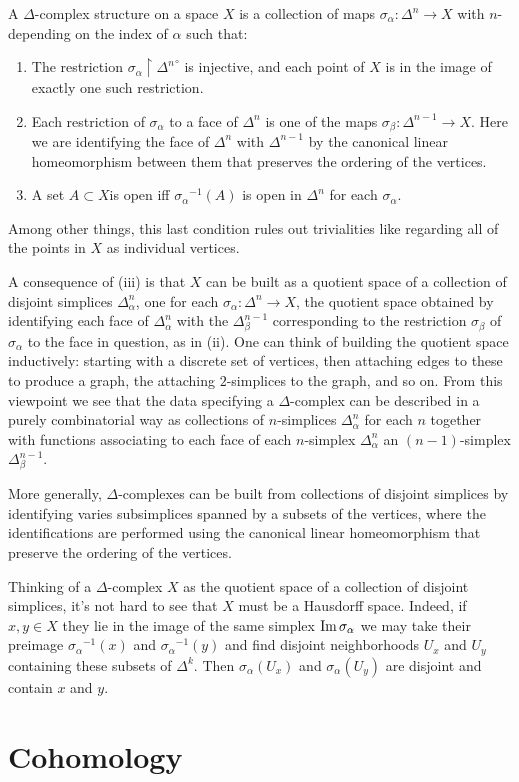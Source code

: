 A $\Delta$-complex structure on a space $X$ is a collection of maps
$\sigma_\alpha\colon\Delta^n\to X$ with $n$-depending on the index of
$\alpha$ such that:
\begin{enumerate}[label=(\roman*)]
\item The restriction
  $\sigma_\alpha\restriction\left.\Delta^n\right.^\circ$ is
  injective, and each point of $X$ is in the image of exactly one such
  restriction.
\item Each restriction of $\sigma_\alpha$ to a face of $\Delta^n$ is one of
  the maps $\sigma_\beta\colon\Delta^{n-1}\to X$. Here we are
  identifying the face of $\Delta^n$ with $\Delta^{n-1}$ by the canonical
  linear homeomorphism between them that preserves the ordering of the
  vertices.
\item A set $A\subset X$is open iff ${\sigma_\alpha}^{-1}(A)$ is open in
  $\Delta^n$ for each $\sigma_\alpha$.
\end{enumerate}
Among other things, this last condition rules out trivialities like
regarding all of the points in $X$ as individual vertices.

A consequence of (iii) is that $X$ can be built as a quotient space of a
collection of disjoint simplices $\Delta_\alpha^n$, one for each
$\sigma_\alpha\colon\Delta^n\to X$, the quotient space obtained by
identifying each face of $\Delta_\alpha^n$ with the $\Delta_\beta^{n-1}$
corresponding to the restriction $\sigma_\beta$ of $\sigma_\alpha$ to the
face in question, as in (ii). One can think of building the quotient space
inductively: starting with a discrete set of vertices, then attaching edges
to these to produce a graph, the attaching $2$-simplices to the graph, and
so on. From this viewpoint we see that the data specifying a
$\Delta$-complex can be described in a purely combinatorial way as
collections of $n$-simplices $\Delta_\alpha^n$ for each $n$ together with
functions associating to each face of each $n$-simplex $\Delta_\alpha^n$ an
$(n-1)$-simplex $\Delta_\beta^{n-1}$.

More generally, $\Delta$-complexes can be built from collections of
disjoint simplices by identifying varies subsimplices spanned by a subsets
of the vertices, where the identifications are performed using the
canonical linear homeomorphism that preserve the ordering of the
vertices.

Thinking of a $\Delta$-complex $X$ as the quotient space of a collection of
disjoint simplices, it's not hard to see that $X$ must be a Hausdorff
space. Indeed, if $x,y\in X$ they lie in the image of the same simplex
$\operatorname{Im}\sigma_\alpha$ we may take their preimage ${\sigma_\alpha}^{-1}(x)$
and ${\sigma_\alpha}^{-1}(y)$ and find disjoint neighborhoods $U_x$ and
$U_y$ containing these subsets of $\Delta^k$. Then $\sigma_\alpha(U_x)$ and
$\sigma_\alpha(U_y)$ are disjoint and contain $x$ and $y$.


\section{Cohomology}

